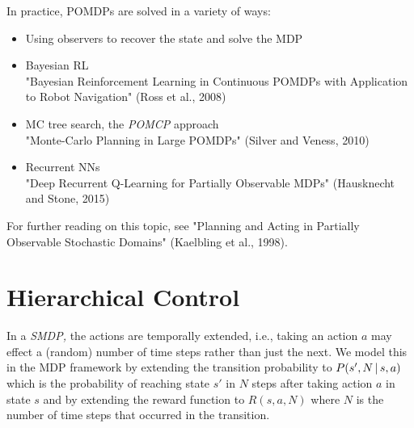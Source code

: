 		In practice, \acp{POMDP} are solved in a variety of ways:
		\begin{itemize}
			\item Using observers to recover the state and solve the \ac{MDP}
			\item Bayesian \ac{RL} \\
				"Bayesian Reinforcement Learning in Continuous \acp{POMDP} with Application to Robot Navigation" (Ross et al., 2008)
			\item \ac{MC} tree search, the \emph{\ac{POMCP}} approach \\
				"Monte-Carlo Planning in Large \acp{POMDP}" (Silver and Veness, 2010)
			\item Recurrent \acp{NN} \\
				"Deep Recurrent Q-Learning for Partially Observable \acp{MDP}" (Hausknecht and Stone, 2015)
		\end{itemize}
		For further reading on this topic, see "Planning and Acting in Partially Observable Stochastic Domains" (Kaelbling et al., 1998).

	\section{Hierarchical Control}
		In a \emph{\ac{SMDP},} the actions are temporally extended, i.e., taking an action \(a\) may effect a (random) number of time steps rather than just the next. We model this in the \ac{MDP} framework by extending the transition probability to \( P(s', N \,\vert\, s, a) \) which is the probability of reaching state \(s'\) in \(N\) steps after taking action \(a\) in state \(s\) and by extending the reward function to \( R(s, a, N) \) where \(N\) is the number of time steps that occurred in the transition.

